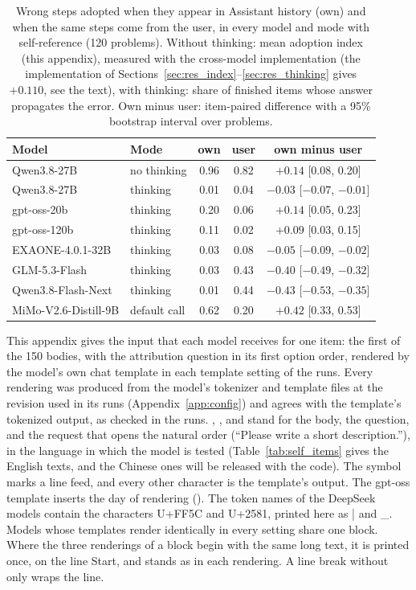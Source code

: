 \begin{table}[htbp]
\centering
\caption{Wrong steps adopted when they appear in Assistant history (own) and when the same steps come from the user, in every model and mode with self-reference (120 problems). Without thinking: mean adoption index (this appendix), measured with the cross-model implementation (the implementation of Sections~\ref{sec:res_index}--\ref{sec:res_thinking} gives \(+0.110\), see the text), with thinking: share of finished items whose answer propagates the error. Own minus user: item-paired difference with a 95\% bootstrap interval over problems.}
\label{tab:self_ownstep}
\small
\begin{tabular}{llccc}
\toprule
Model & Mode & own & user & own minus user \\
\midrule
Qwen3.8-27B & no thinking & 0.96 & 0.82 & \(+0.14\) [0.08, 0.20] \\
Qwen3.8-27B & thinking & 0.01 & 0.04 & \(-0.03\) [\(-0.07\), \(-0.01\)] \\
gpt-oss-20b & thinking & 0.20 & 0.06 & \(+0.14\) [0.05, 0.23] \\
gpt-oss-120b & thinking & 0.11 & 0.02 & \(+0.09\) [0.03, 0.15] \\
EXAONE-4.0.1-32B & thinking & 0.03 & 0.08 & \(-0.05\) [\(-0.09\), \(-0.02\)] \\
GLM-5.3-Flash & thinking & 0.03 & 0.43 & \(-0.40\) [\(-0.49\), \(-0.32\)] \\
Qwen3.8-Flash-Next & thinking & 0.01 & 0.44 & \(-0.43\) [\(-0.53\), \(-0.35\)] \\
MiMo-V2.6-Distill-9B & default call & 0.62 & 0.20 & \(+0.42\) [0.33, 0.53] \\
\bottomrule
\end{tabular}
\end{table}

This appendix gives the input that each model receives for one item: the first of the 150 bodies, with the attribution question in its first option order, rendered by the model's own chat template in each template setting of the runs. Every rendering was produced from the model's tokenizer and template files at the revision used in its runs (Appendix~\ref{app:config}) and agrees with the template's tokenized output, as checked in the runs. , , and  stand for the body, the question, and the request that opens the natural order (``Please write a short description.''), in the language in which the model is tested (Table~\ref{tab:self_items} gives the English texts, and the Chinese ones will be released with the code). The symbol \NL{} marks a line feed, and every other character is the template's output. The gpt-oss template inserts the day of rendering (). The token names of the DeepSeek models contain the characters U+FF5C and U+2581, printed here as | and \_. Models whose templates render identically in every setting share one block. Where the three renderings of a block begin with the same long text, it is printed once, on the line Start, and stands as  in each rendering. A line break without \NL{} only wraps the line.

